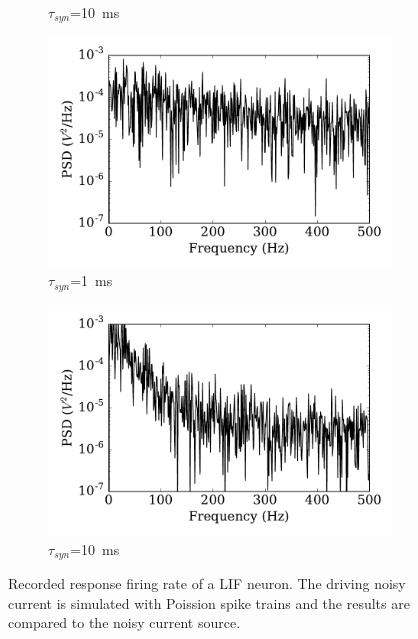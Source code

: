 \begin{figure}[btp!]
\begin{subfigure}[t]{0.49\textwidth}
		\caption{$\tau_{syn}$=10~ms}
	\end{subfigure}
	\begin{subfigure}[t]{0.49\textwidth}
		\includegraphics[width=\textwidth]{pics_iconip/psd_tau1.pdf}
		\caption{$\tau_{syn}$=1~ms}
	\end{subfigure}
	\begin{subfigure}[t]{0.49\textwidth}
		\includegraphics[width=\textwidth]{pics_iconip/psd_tau10.pdf}
		\caption{$\tau_{syn}$=10~ms}
	\end{subfigure}
	\caption{Recorded response firing rate of a LIF neuron.
		The driving noisy current is simulated with Poission spike trains and the results are compared to the noisy current source.}
	\label{Fig:lif_pois}
\end{figure}

